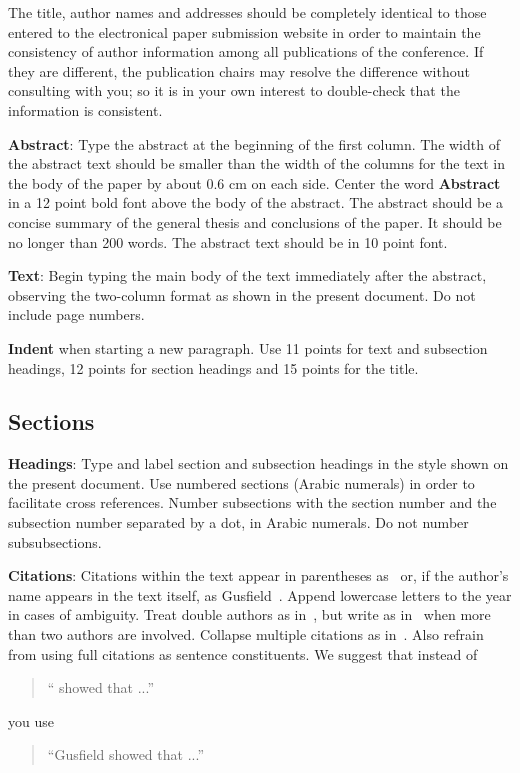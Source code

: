 \documentclass[11pt]{article}
\begin{document}
The title, author names and addresses should be completely identical
to those entered to the electronical paper submission website in order
to maintain the consistency of author information among all
publications of the conference. If they are different, the publication
chairs may resolve the difference without consulting with you; so it
is in your own interest to double-check that the information is
consistent.

{\bf Abstract}: Type the abstract at the beginning of the first
column. The width of the abstract text should be smaller than the
width of the columns for the text in the body of the paper by about
0.6 cm on each side. Center the word {\bf Abstract} in a 12 point bold
font above the body of the abstract. The abstract should be a concise
summary of the general thesis and conclusions of the paper. It should
be no longer than 200 words. The abstract text should be in 10 point font.

{\bf Text}: Begin typing the main body of the text immediately after
the abstract, observing the two-column format as shown in 
the present document. Do not include page numbers.

{\bf Indent} when starting a new paragraph. Use 11 points for text and 
subsection headings, 12 points for section headings and 15 points for
the title. 

\subsection{Sections}

{\bf Headings}: Type and label section and subsection headings in the
style shown on the present document.  Use numbered sections (Arabic
numerals) in order to facilitate cross references. Number subsections
with the section number and the subsection number separated by a dot,
in Arabic numerals. Do not number subsubsections.

{\bf Citations}: Citations within the text appear in parentheses
as~\cite{Gusfield:97} or, if the author's name appears in the text
itself, as Gusfield~.  Append lowercase letters
to the year in cases of ambiguity.  Treat double authors as
in~\cite{Aho:72}, but write as in~\cite{Chandra:81} when more than two
authors are involved. Collapse multiple citations as
in~\cite{Gusfield:97,Aho:72}. Also refrain from using full citations
as sentence constituents. We suggest that instead of
\begin{quote}
  ``\cite{Gusfield:97} showed that ...''
\end{quote}
you use
\begin{quote}
``Gusfield    showed that ...''
\end{quote}
\end{document}
